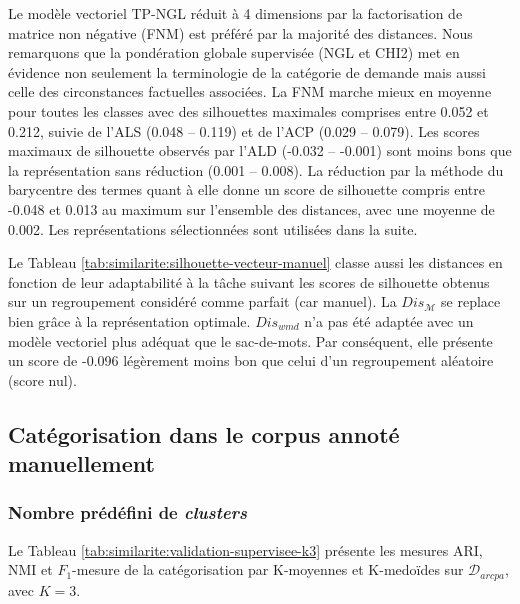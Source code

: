  
Le modèle vectoriel TP-NGL réduit à 4 dimensions par la factorisation de matrice non négative (FNM) est préféré par la majorité des distances. Nous remarquons que la pondération globale supervisée (NGL et CHI2) met en évidence non seulement la terminologie de la catégorie de demande mais aussi celle des circonstances factuelles associées. La FNM marche mieux en moyenne pour toutes les classes avec des silhouettes maximales comprises entre 0.052 et 0.212, suivie de l'ALS (0.048 -- 0.119) et de l'ACP (0.029 -- 0.079). Les scores maximaux de silhouette observés par l'ALD (-0.032 -- -0.001) sont moins bons que la représentation sans réduction (0.001 -- 0.008). La réduction par la méthode du barycentre des termes quant à elle donne un score de silhouette compris entre -0.048 et 0.013 au maximum sur l'ensemble des distances, avec une moyenne de 0.002.
Les représentations sélectionnées sont utilisées dans la suite. 

Le Tableau \ref{tab:similarite:silhouette-vecteur-manuel} classe aussi les distances en fonction de leur adaptabilité à la tâche suivant les scores de silhouette obtenus sur un regroupement considéré comme parfait (car manuel). La $Dis_\mathcal{M}$ se replace bien grâce à la représentation optimale. $Dis_{wmd}$ n'a pas été adaptée avec un modèle vectoriel plus adéquat que le sac-de-mots. Par conséquent, elle présente un score de -0.096 légèrement moins bon que celui d'un regroupement aléatoire (score nul).

\subsection{Catégorisation dans le corpus annoté manuellement}
\subsubsection{Nombre prédéfini de \textit{clusters}}
 Le Tableau \ref{tab:similarite:validation-supervisee-k3} présente les mesures ARI, NMI et $F_1$-mesure de la catégorisation par K-moyennes et K-medoïdes sur $\mathcal{D}_{arcpa}$, avec $K=3$. 

